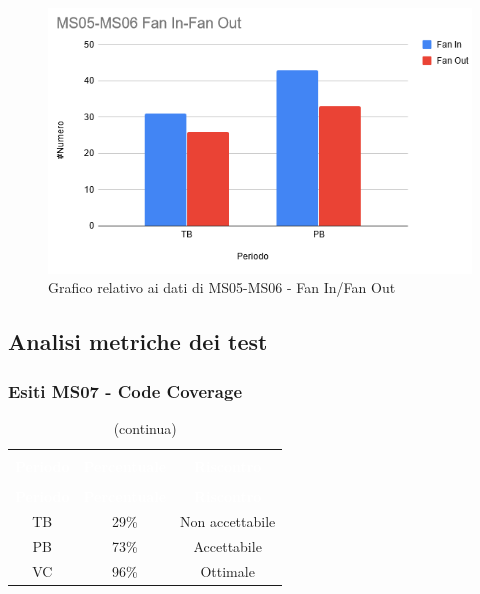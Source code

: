 \begin{figure}[H]
\centering
\includegraphics[scale=0.7]{./img/MS05-MS06.png}
\caption{Grafico relativo ai dati di MS05-MS06 - Fan In/Fan Out}
\end{figure}

\pagebreak
\subsection{Analisi metriche dei test}
\subsubsection{Esiti MS07 - Code Coverage}
\begin{longtable}{c c c}
\rowcolor{white}\caption{Esiti MS07 - Code Coverage} \\
	\rowcolor{redafk}
\textcolor{white}{\textbf{Periodo}} & 
\textcolor{white}{\textbf{Percentuale}} & 
\textcolor{white}{\textbf{Riscontro}} \\
	\endfirsthead
		\rowcolor{white}\caption[]{(continua)} \\
		\rowcolor{redafk}
\textcolor{white}{\textbf{Periodo}} & 
\textcolor{white}{\textbf{Percentuale}} & 
\textcolor{white}{\textbf{Riscontro}} \\
	\endhead
	TB & 29\% & Non accettabile\\
	PB & 73\% & Accettabile\\
	VC & 96\% & Ottimale\\
\end{longtable}

